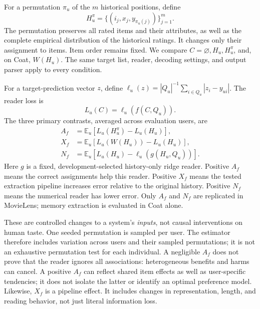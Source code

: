 \documentclass{article}
\newcommand{\E}{\mathbb{E}}
\begin{document}
For a permutation $\pi_u$ of the $m$ historical positions, define
\begin{equation}
 H_u^{\pi}=\{(i_j,x_j,y_{\pi_u(j)})\}_{j=1}^{m}.
\end{equation}
The permutation preserves all rated items and their attributes, as well as the complete empirical distribution of the historical ratings. It changes only their assignment to items. Item order remains fixed. We compare $C=\varnothing,H_u,H_u^\pi$, and, on Coat, $W(H_u)$. The same target list, reader, decoding settings, and output parser apply to every condition.

For a target-prediction vector $z$, define $\ell_u(z)=|Q_u|^{-1}\sum_{i\in Q_u}|z_i-y_{ui}|$. The reader loss is
\begin{equation}
 L_u(C)=\ell_u(f(C,Q_u)).
\end{equation}
The three primary contrasts, averaged across evaluation users, are
\begin{align}
 A_f &= \E_u[L_u(H_u^\pi)-L_u(H_u)],\\
 X_f &= \E_u[L_u(W(H_u))-L_u(H_u)],\\
 N_f &= \E_u[L_u(H_u)-\ell_u(g(H_u,Q_u))].
\end{align}
Here $g$ is a fixed, development-selected history-only ridge reader. Positive $A_f$ means the correct assignments help this reader. Positive $X_f$ means the tested extraction pipeline increases error relative to the original history. Positive $N_f$ means the numerical reader has lower error. Only $A_f$ and $N_f$ are replicated in MovieLens; memory extraction is evaluated in Coat alone.

These are controlled changes to a system's \emph{inputs}, not causal interventions on human taste. One seeded permutation is sampled per user. The estimator therefore includes variation across users and their sampled permutations; it is not an exhaustive permutation test for each individual. A negligible $A_f$ does not prove that the reader ignores all associations: heterogeneous benefits and harms can cancel. A positive $A_f$ can reflect shared item effects as well as user-specific tendencies; it does not isolate the latter or identify an optimal preference model. Likewise, $X_f$ is a pipeline effect. It includes changes in representation, length, and reading behavior, not just literal information loss.
\end{document}

